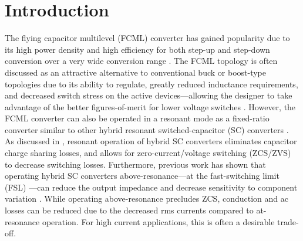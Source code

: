 \vspace{-5pt}
\section{Introduction}
\vspace{-0.75em}






The flying capacitor multilevel (FCML) converter has gained popularity due to its high power density and high efficiency for both step-up and step-down conversion over a very wide conversion range \cite{Meynard_PESC1992,Modeer_TPEL2020}.
The FCML topology is often discussed as an attractive alternative to conventional buck or boost-type topologies due to its ability to regulate, greatly reduced inductance requirements, and decreased switch stress on the active devices---allowing the designer to take advantage of the better figures-of-merit for lower voltage switches \cite{Stauth_CICC2018}.
However, the FCML converter can also be operated in a resonant mode as a fixed-ratio converter similar to other hybrid resonant switched-capacitor (SC) converters \cite{Kesarwani_COMPEL2015,Schaef_TPEL2018}.
As discussed in \cite{Lei_TPEL2015_GeneralSoftCharging,Pasternak_TPEL2017}, resonant operation of hybrid SC converters eliminates capacitor charge sharing losses, and allows for zero-current/voltage switching (ZCS/ZVS) to decrease switching losses.
Furthermore, previous work has shown that operating hybrid SC converters above-resonance---at the fast-switching limit (FSL) \cite{Seeman2008}---can reduce the output impedance  \cite{Rentmeister_COMPEL2018} and decrease sensitivity to component variation  \cite{Ye_TPEL2020_CascResc}.
While operating above-resonance precludes ZCS, conduction and ac losses can be reduced due to the decreased rms currents compared to at-resonance operation.
For high current applications, this is often a desirable trade-off. 




